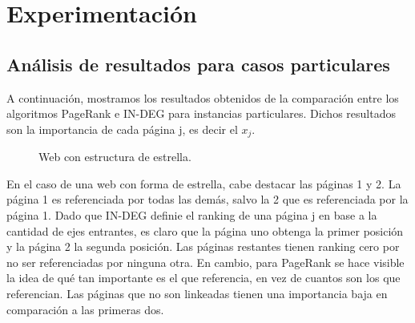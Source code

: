 \section{Experimentación}

\subsection{Análisis de resultados para casos particulares}

A continuación, mostramos los resultados obtenidos de la comparación entre los algoritmos PageRank e IN-DEG para instancias particulares. Dichos resultados son la importancia de cada página j, es decir el $x_{j}$. \\

\begin{figure}[H]
\centering     %
{}
\caption{Web con estructura de estrella.}
\end{figure}

En el caso de una web con forma de estrella, cabe destacar las páginas 1 y 2. La página 1 es referenciada por todas las demás, salvo la 2 que es referenciada por la página 1. Dado que IN-DEG definie el ranking de una página j en base a la cantidad de ejes entrantes, es claro que la página uno obtenga la primer posición y la página 2 la segunda posición. Las páginas restantes tienen ranking cero por no ser referenciadas por ninguna otra.
En cambio, para PageRank se hace visible la idea de qué tan importante es el que referencia, en vez de cuantos son los que referencian. Las páginas que no son linkeadas tienen una importancia baja en comparación a las primeras dos.


